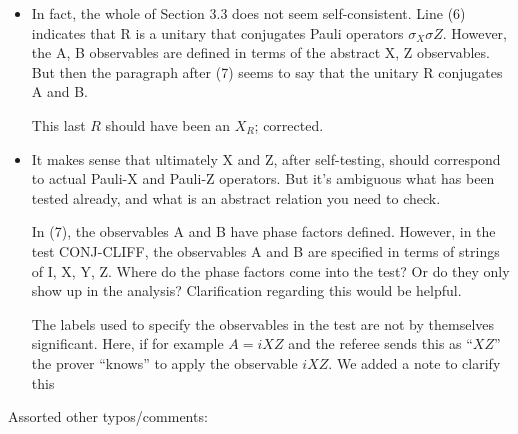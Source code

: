 \documentclass[12pt]{article}
\begin{document}
\begin{itemize}
\item 
In fact, the whole of Section 3.3 does not seem self-consistent. Line (6) indicates that R is a unitary that conjugates Pauli operators $\sigma_X \sigma Z$. However, the A, B observables are defined in terms of the abstract X, Z observables. But then the paragraph after (7) seems to say that the unitary R conjugates A and B. 

{\color{blue} This last $R$ should have been an $X_R$; corrected.}

\item 
It makes sense that ultimately X and Z, after self-testing, should correspond to actual Pauli-X and Pauli-Z operators. But it’s ambiguous what has been tested already, and what is an abstract relation you need to check. 

In (7), the observables A and B have phase factors defined. However, in the test CONJ-CLIFF, the observables A and B are specified in terms of strings of I, X, Y, Z. Where do the phase factors come into the test? Or do they only show up in the analysis? Clarification regarding this would be helpful.

{\color{blue} The labels used to specify the observables in the test are not by themselves significant. Here, if for example $A = iXZ$ and the referee sends this as ``$XZ$'' the prover ``knows'' to apply the observable $iXZ$. We added a note to clarify this}

\end{itemize}

Assorted other typos/comments:
\end{document}
